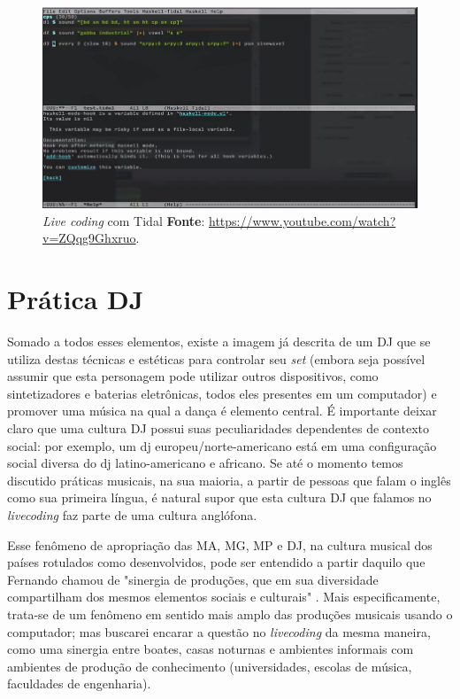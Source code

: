 \begin{figure}
\begin{center}
\includegraphics[scale=0.5]{./imagens/tidal.png}
\caption{\emph{Live coding} com Tidal \textbf{Fonte}: \url{https://www.youtube.com/watch?v=ZQqg9Ghxruo}.}
\label{fig:lc_tidal}
\end{center}
\end{figure}

\section{Prática DJ}\label{sec:musica_vanguarda_pista}

Somado a todos esses elementos, existe a imagem já descrita de um DJ que se utiliza destas técnicas e estéticas para controlar seu \emph{set} (embora seja possível assumir que esta personagem pode utilizar outros dispositivos, como sintetizadores e baterias eletrônicas, todos eles presentes em um computador) e promover uma música na qual a dança é elemento central. É importante deixar claro que uma cultura DJ possui suas peculiaridades dependentes de contexto social: por exemplo, um dj europeu/norte-americano está em uma configuração social diversa do dj latino-americano e africano. Se até o momento temos discutido práticas musicais, na sua maioria, a partir de pessoas que falam o inglês como sua primeira língua, é natural supor que esta cultura DJ que falamos no \emph{livecoding} faz parte de uma cultura anglófona.

Esse fenômeno de apropriação das MA, MG, MP e DJ, na cultura musical dos países rotulados como desenvolvidos, pode ser entendido a partir daquilo que Fernando   chamou de "sinergia de produções, que em sua diversidade compartilham dos mesmos elementos sociais e culturais" \cite[p.~152]{iazzetta_musica_2009}. Mais especificamente, trata-se de um fenômeno em sentido mais amplo das produções musicais usando o computador; mas buscarei encarar a questão no \emph{livecoding} da mesma maneira, como uma sinergia entre boates, casas noturnas e ambientes informais com ambientes de produção de conhecimento (universidades, escolas de música, faculdades de engenharia).

